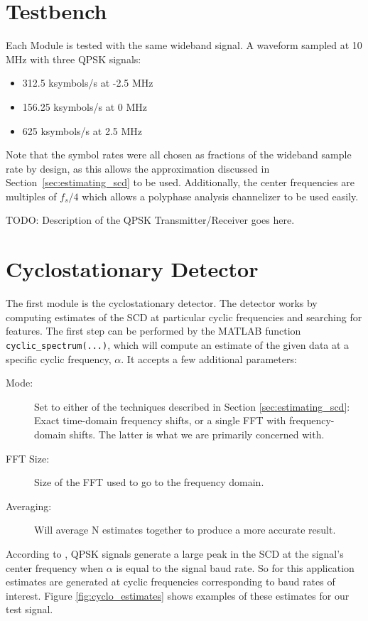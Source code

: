 \documentclass[12pt]{report}
\begin{document}
\section{Testbench}
Each Module is tested with the same wideband signal. A waveform sampled at 10 MHz with three QPSK signals:
\begin{itemize}
    \item{312.5 ksymbols/s at -2.5 MHz}
    \item{156.25 ksymbols/s at 0 MHz}
    \item{625 ksymbols/s at 2.5 MHz}
\end{itemize}
Note that the symbol rates were all chosen as fractions of the wideband sample
rate by design, as this allows the approximation discussed in
Section~\ref{sec:estimating_scd} to be used. Additionally, the center
frequencies are multiples of $f_s/4$ which allows a polyphase analysis
channelizer to be used easily.

TODO: Description of the QPSK Transmitter/Receiver goes here.

\section{Cyclostationary Detector}
\label{sec:sim_cyclo}
The first module is the cyclostationary detector. The detector works by
computing estimates of the SCD at particular cyclic frequencies and searching
for features. The first step can be performed by the MATLAB function
\texttt{cyclic\_spectrum(...)}, which will compute an estimate of the given
data at a specific cyclic frequency, $\alpha$.  It accepts a few additional
parameters:

\begin{description}
    \item[Mode:] Set to either of the techniques described in Section
    \ref{sec:estimating_scd}: Exact time-domain frequency shifts, or a single
    FFT with frequency-domain shifts. The latter is what we are primarily concerned
    with.
    \item[FFT Size:]Size of the FFT used to go to the frequency domain.
    \item[Averaging:]Will average N estimates together to produce a more accurate
    result.
\end{description}

According to \cite{Gardner2}, QPSK signals generate a large peak in the SCD at
the signal's center frequency when $\alpha$ is equal to the signal baud rate.
So for this application estimates are generated at cyclic frequencies
corresponding to baud rates of interest. Figure \ref{fig:cyclo_estimates} shows
examples of these estimates for our test signal.
\end{document}

